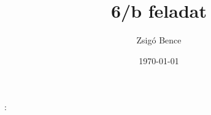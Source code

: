 \documentclass{book}
\begin{document}
\title{6/b feladat}
\author{Zsigó Bence}
\date{\today}
\maketitle
\hulipsum:
\end{document}
